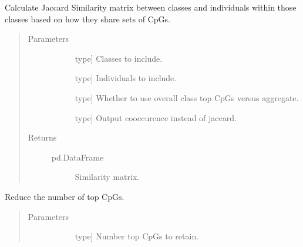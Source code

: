 \documentclass[letterpaper,10pt,english]{sphinxmanual}
\begin{document}
\begin{fulllineitems}
\begin{fulllineitems}
\label{\detokenize{index:methylnet.interpretation_classes.ShapleyDataExplorer.jaccard_similarity_top_cpgs}}
Calculate Jaccard Similarity matrix between classes and individuals within those classes based on how they share sets of CpGs.
\begin{quote}\begin{description}
\item[{Parameters}] \leavevmode\begin{description}
\item[{}] \leavevmode{[}type{]}
Classes to include.

\item[{}] \leavevmode{[}type{]}
Individuals to include.

\item[{}] \leavevmode{[}type{]}
Whether to use overall class top CpGs versus aggregate.

\item[{}] \leavevmode{[}type{]}
Output cooccurence instead of jaccard.

\end{description}

\item[{Returns}] \leavevmode\begin{description}
\item[{pd.DataFrame}] \leavevmode
Similarity matrix.

\end{description}

\end{description}\end{quote}

\end{fulllineitems}


\begin{fulllineitems}
\label{\detokenize{index:methylnet.interpretation_classes.ShapleyDataExplorer.limit_number_top_cpgs}}
Reduce the number of top CpGs.
\begin{quote}\begin{description}
\item[{Parameters}] \leavevmode\begin{description}
\item[{}] \leavevmode{[}type{]}
Number top CpGs to retain.


\end{description}
\end{description}
\end{quote}
\end{fulllineitems}
\end{fulllineitems}
\end{document}
